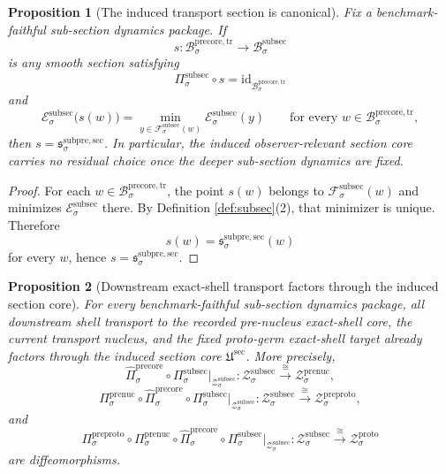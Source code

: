 \documentclass[11pt]{article}
\newcommand{\ProtoShellSet}[1]{\mathcal Z_{#1}^{\mathrm{proto}}}
\newcommand{\PreProtoProj}[1]{\Pi_{#1}^{\mathrm{preproto}}}
\newcommand{\PreProtoShellSet}[1]{\mathcal Z_{#1}^{\mathrm{preproto}}}
\newcommand{\PreNucProj}[1]{\Pi_{#1}^{\mathrm{prenuc}}}
\newcommand{\PreNucShellSet}[1]{\mathcal Z_{#1}^{\mathrm{prenuc}}}
\newcommand{\PreCoreTrBody}[1]{\mathcal B_{#1}^{\mathrm{precore,tr}}}
\newcommand{\PreCoreTrProj}[1]{\widehat{\Pi}_{#1}^{\mathrm{precore}}}
\newcommand{\SubPreSectionCore}{\mathfrak U^{\mathrm{sec}}}
\newcommand{\SubPreSection}[1]{\mathfrak s_{#1}^{\mathrm{subpre,sec}}}
\newcommand{\SubSectionBody}[1]{\mathcal B_{#1}^{\mathrm{subsec}}}
\newcommand{\SubSectionProj}[1]{\Pi_{#1}^{\mathrm{subsec}}}
\newcommand{\SubSectionFunctional}[1]{\mathscr E_{#1}^{\mathrm{subsec}}}
\newcommand{\SubSectionFiber}[2]{\mathcal F_{#1}^{\mathrm{subsec}}(#2)}
\newcommand{\SubSectionShell}[1]{\mathcal Z_{#1}^{\mathrm{subsec}}}
\newtheorem{proposition}{Proposition}
\begin{document}
\begin{proposition}[The induced transport section is canonical]
\label{prop:canonical}
Fix a benchmark-faithful sub-section dynamics package. If
\[
s:\PreCoreTrBody{\sigma}\to\SubSectionBody{\sigma}
\]
is any smooth section satisfying
\[
\SubSectionProj{\sigma}\circ s
=
\mathrm{id}_{\PreCoreTrBody{\sigma}}
\]
and
\[
\SubSectionFunctional{\sigma}\bigl(s(w)\bigr)
=
\min_{y\in\SubSectionFiber{\sigma}{w}}
\SubSectionFunctional{\sigma}(y)
\qquad
\text{for every }
w\in\PreCoreTrBody{\sigma},
\]
then \(s=\SubPreSection{\sigma}\). In particular, the induced observer-relevant section core carries no residual choice once the deeper sub-section dynamics are fixed.
\end{proposition}

\begin{proof}
For each \(w\in\PreCoreTrBody{\sigma}\), the point \(s(w)\) belongs to \(\SubSectionFiber{\sigma}{w}\) and minimizes \(\SubSectionFunctional{\sigma}\) there. By Definition \ref{def:subsec}(2), that minimizer is unique. Therefore
\[
s(w)=\SubPreSection{\sigma}(w)
\]
for every \(w\), hence \(s=\SubPreSection{\sigma}\).
\end{proof}

\begin{proposition}[Downstream exact-shell transport factors through the induced section core]
\label{prop:downstream}
For every benchmark-faithful sub-section dynamics package, all downstream shell transport to the recorded pre-nucleus exact-shell core, the current transport nucleus, and the fixed proto-germ exact-shell target already factors through the induced section core \(\SubPreSectionCore\). More precisely,
\[
\PreCoreTrProj{\sigma}\circ
\SubSectionProj{\sigma}\big|_{\SubSectionShell{\sigma}}
:
\SubSectionShell{\sigma}\xrightarrow{\cong}\PreNucShellSet{\sigma},
\]
\[
\PreNucProj{\sigma}\circ\PreCoreTrProj{\sigma}\circ
\SubSectionProj{\sigma}\big|_{\SubSectionShell{\sigma}}
:
\SubSectionShell{\sigma}\xrightarrow{\cong}\PreProtoShellSet{\sigma},
\]
and
\[
\PreProtoProj{\sigma}\circ\PreNucProj{\sigma}\circ\PreCoreTrProj{\sigma}\circ
\SubSectionProj{\sigma}\big|_{\SubSectionShell{\sigma}}
:
\SubSectionShell{\sigma}\xrightarrow{\cong}\ProtoShellSet{\sigma}
\]
are diffeomorphisms.
\end{proposition}
\end{document}
